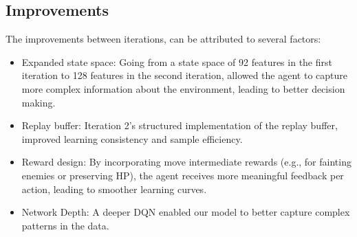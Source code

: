 \subsection{Improvements}
The improvements between iterations, can be attributed to several factors:
\begin{itemize}
    \item Expanded state space: Going from a state space of 92 features in the first iteration
          to 128 features in the second iteration, allowed the agent to capture more complex information
          about the environment, leading to better decision making.
    \item Replay buffer: Iteration 2's structured implementation of the replay buffer, improved
          learning consistency and sample efficiency.
    \item Reward design: By incorporating move intermediate rewards (e.g., for fainting enemies or preserving HP),
          the agent receives more meaningful feedback per action, leading to smoother learning curves.
    \item Network Depth: A deeper DQN enabled our model to better capture complex patterns in the data.
\end{itemize}
